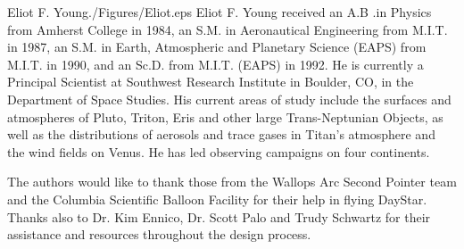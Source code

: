 \documentclass[twocolumn,letterpaper]{IEEEAerospace2012}
\newcommand{\rootdir}{./Figures/}
\begin{document}
\begin{biographywithpic}{Eliot F. Young}{\rootdir Eliot.eps}
Eliot F. Young received an A.B .in Physics from Amherst College in 1984, an S.M. in Aeronautical Engineering from M.I.T. in 1987, an S.M. in Earth, Atmospheric and Planetary Science (EAPS) from M.I.T. in 1990, and an Sc.D. from M.I.T. (EAPS) in 1992. He is currently a Principal Scientist at Southwest Research Institute in Boulder, CO, in the Department of Space Studies. His current areas of study include the surfaces and atmospheres of Pluto, Triton, Eris and other large Trans-Neptunian Objects, as well as the distributions of aerosols and trace gases in Titan's atmosphere and the wind fields on Venus. He has led observing campaigns on four continents.
\end{biographywithpic}

\acknowledgments
The authors would like to thank those from the Wallops Arc Second Pointer team and the Columbia Scientific Balloon Facility for their help in flying DayStar. Thanks also to Dr. Kim Ennico, Dr. Scott Palo and Trudy Schwartz for their assistance and resources throughout the design process.
\end{document}
